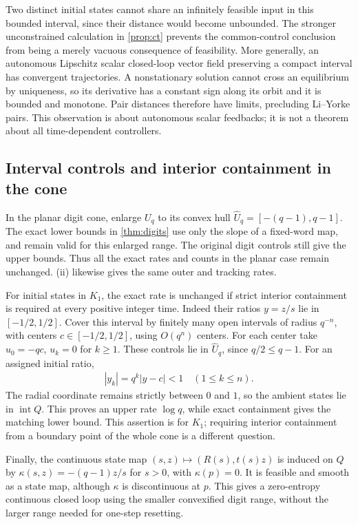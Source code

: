 \documentclass[11pt,a4paper]{article}
\theoremstyle{definition}
\theoremstyle{remark}
\begin{document}
Two distinct initial states cannot share an infinitely feasible input in this bounded interval, since their distance would become unbounded. The stronger unconstrained calculation in \cref{prop:ct} prevents the common-control conclusion from being a merely vacuous consequence of feasibility.
More generally, an autonomous Lipschitz scalar closed-loop vector field preserving a compact interval has convergent trajectories. A nonstationary solution cannot cross an equilibrium by uniqueness, so its derivative has a constant sign along its orbit and it is bounded and monotone. Pair distances therefore have limits, precluding Li--Yorke pairs. This observation is about autonomous scalar feedbacks; it is not a theorem about all time-dependent controllers.

\subsection{Interval controls and interior containment in the cone}

In the planar digit cone, enlarge \(U_q\) to its convex hull
\(\widehat U_q=[-(q-1),q-1]\).
The exact lower bounds in \cref{thm:digits} use only the slope of a fixed-word map, and remain valid for this enlarged range. The original digit controls still give the upper bounds. Thus all the exact rates and counts in the planar case remain unchanged. (ii) likewise gives the same outer and tracking rates.

For initial states in \(K_1\), the exact rate is unchanged if strict interior containment is required at every positive integer time. Indeed their ratios \(y=z/s\) lie in \([-1/2,1/2]\). Cover this interval by finitely many open intervals of radius \(q^{-n}\), with centers \(c\in[-1/2,1/2]\), using \(O(q^n)\) centers. For each center take \(u_0=-qc\), \(u_k=0\) for \(k\geq1\). These controls lie in \(\widehat U_q\), since \(q/2\leq q-1\). For an assigned initial ratio,
\begin{align*}
 |y_k|=q^k|y-c|<1\quad(1\leq k\leq n).
\end{align*}
The radial coordinate remains strictly between \(0\) and \(1\), so the ambient states lie in \(\operatorname{int} Q\). This proves an upper rate \(\log q\), while exact containment gives the matching lower bound. This assertion is for \(K_1\); requiring interior containment from a boundary point of the whole cone is a different question.

Finally, the continuous state map \((s,z)\mapsto(R(s),t(s)z)\) is induced on \(Q\) by
\(\kappa(s,z)=-(q-1)z/s\) for \(s>0\), with \(\kappa(p)=0\).
It is feasible and smooth as a state map, although \(\kappa\) is discontinuous at \(p\). This gives a zero-entropy continuous closed loop using the smaller convexified digit range, without the larger range needed for one-step resetting.
\end{document}
